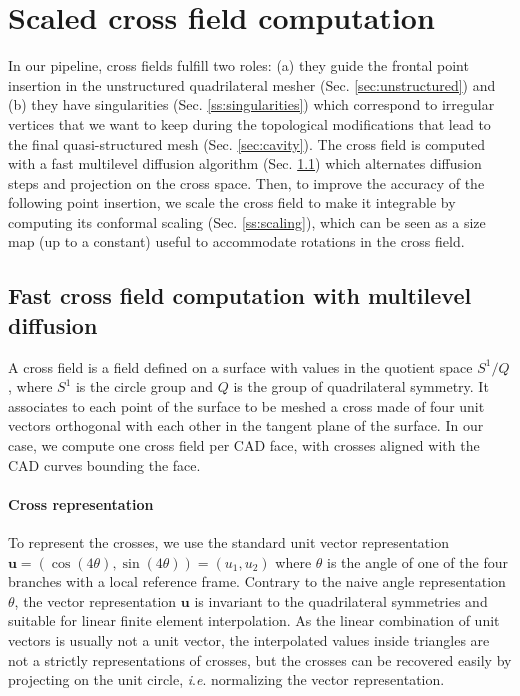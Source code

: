 \documentclass[AMA,STIX1COL]{WileyNJD-v2}
\newcommand{\vu}{\ensuremath{\mathbf{u}}}
\newcommand{\ie}{\textit{i}.\textit{e}. }
\newcommand\rsec[1]{Sec. \ref{#1}}
\begin{document}
{\section{Scaled cross field computation}
\label{sec:cross}
In our pipeline, cross fields fulfill two roles: (a) they guide the
frontal point insertion in the unstructured quadrilateral mesher
(\rsec{sec:unstructured}) and (b) they have singularities (\rsec{ss:singularities})
which correspond to irregular
vertices that we want to keep during the topological modifications
that lead to the final quasi-structured mesh (\rsec{sec:cavity}).
The cross field is computed with a fast multilevel diffusion
algorithm (\rsec{ss:heat}) which alternates diffusion steps and projection
on the cross space.
Then, to improve the accuracy of the following point insertion, we scale the cross field
to make it integrable by computing its conformal scaling (\rsec{ss:scaling}), 
which can be seen as a size map (up to a constant) useful to accommodate rotations
in the cross field.

% 

\subsection{Fast cross field computation with multilevel diffusion}
\label{ss:heat}

A cross field is a field defined on a surface with values in the
quotient space $S^1/Q$, where $S^1$ is the circle group and $Q$ is the group of
quadrilateral symmetry. It associates to each point of the
surface to be meshed a cross made of four unit vectors orthogonal
with each other in the tangent plane of the surface.
In our case, we compute one cross field per CAD face, with crosses aligned
with the CAD curves bounding the face.

\paragraph{Cross representation}
To represent the crosses, we use the standard unit vector representation
$\vu = (\cos (4\theta), \sin (4\theta)) = (u_1,u_2)$ \cite{hertzmann2000}
where $\theta$ is the angle of one of the four branches with a local
reference frame. Contrary to the naive angle representation $\theta$,
the vector representation $\vu$ is invariant to the quadrilateral symmetries and
suitable for linear finite element interpolation. As the linear combination of unit vectors
is usually not a unit vector, the interpolated values inside triangles are not
a strictly representations of crosses, but the crosses can be recovered easily 
by projecting on the unit circle, \ie normalizing the vector representation.

}
\end{document}
